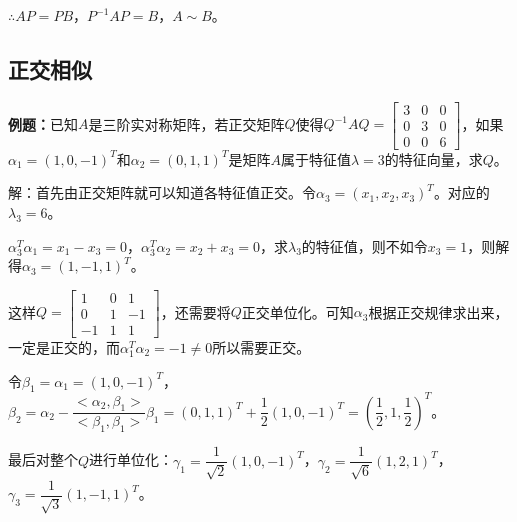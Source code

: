 \documentclass[UTF8, 12pt]{ctexart}
\begin{document}
$\therefore AP=PB$，$P^{-1}AP=B$，$A\sim B$。

\subsection{正交相似}

\textbf{例题：}已知$A$是三阶实对称矩阵，若正交矩阵$Q$使得$Q^{-1}AQ=\left[\begin{array}{ccc}
    3 & 0 & 0 \\
    0 & 3 & 0 \\
    0 & 0 & 6
\end{array}\right]$，如果$\alpha_1=(1,0,-1)^T$和$\alpha_2=(0,1,1)^T$是矩阵$A$属于特征值$\lambda=3$的特征向量，求$Q$。

解：首先由正交矩阵就可以知道各特征值正交。令$\alpha_3=(x_1,x_2,x_3)^T$。对应的$\lambda_3=6$。

$\alpha_3^T\alpha_1=x_1-x_3=0$，$\alpha_3^T\alpha_2=x_2+x_3=0$，求$\lambda_3$的特征值，则不如令$x_3=1$，则解得$\alpha_3=(1,-1,1)^T$。

这样$Q=\left[\begin{array}{ccc}
    1 & 0 & 1 \\
    0 & 1 & -1 \\
    -1 & 1 & 1
\end{array}\right]$，还需要将$Q$正交单位化。可知$\alpha_3$根据正交规律求出来，一定是正交的，而$\alpha_1^T\alpha_2=-1\neq0$所以需要正交。

令$\beta_1=\alpha_1=(1,0,-1)^T$，$\beta_2=\alpha_2-\dfrac{<\alpha_2,\beta_1>}{<\beta_1,\beta_1>}\beta_1=(0,1,1)^T+\dfrac{1}{2}(1,0,-1)^T=(\dfrac{1}{2},1,\dfrac{1}{2})^T$。

最后对整个$Q$进行单位化：$\gamma_1=\dfrac{1}{\sqrt{2}}(1,0,-1)^T$，$\gamma_2=\dfrac{1}{\sqrt{6}}(1,2,1)^T$，$\gamma_3=\dfrac{1}{\sqrt{3}}(1,-1,1)^T$。
\end{document}
